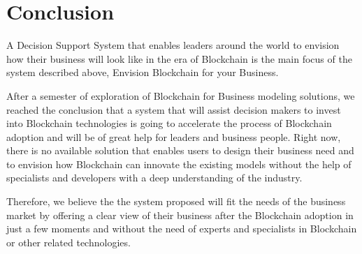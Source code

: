 \chapter{Conclusion}
\label{chapter:conclusion}
A Decision Support System that enables leaders around the world to envision how their business will look like in the era of Blockchain is the main focus of the system described above,  Envision Blockchain for your Business.

After a semester of exploration of Blockchain for Business modeling solutions, we reached the conclusion that a system that will assist decision makers to invest into Blockchain technologies is going to accelerate the process of Blockchain adoption and will be of great help for leaders and business people. Right now, there is no available solution that enables users to design their business need and to envision how Blockchain can innovate the existing models without the help of specialists and developers with a deep understanding of the industry.

Therefore, we believe the the system proposed will fit the needs of the business market by offering a clear view of their business after the Blockchain adoption in just a few moments and without the need of experts and specialists in Blockchain or other related technologies.